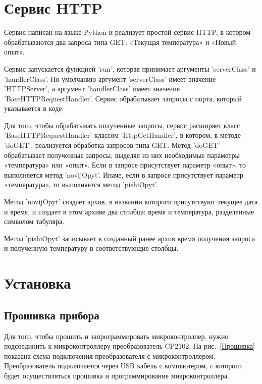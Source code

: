 \documentclass[12pt]{extarticle}
\begin{document}
\section{Сервис HTTP}\label{Сервис HTTP}

Сервис написан на языке Python и реализует простой сервис HTTP, в котором обрабатываются два запроса типа GET: «Текущая температура» и «Новый опыт».

Сервис запускается функцией 'run', которая принимает аргументы 'server\-Class' и 'handlerClass'. По умолчанию аргумент 'serverClass' имеет значение 'HTTPServer', а аргумент 'handlerClass' имеет значение 'Base\-HTTP\-Request\-Handler'. Сервис обрабатывает запросы с порта, который указывается в коде.

Для того, чтобы обрабатывать полученные запросы, сервис расширяет класс 'BaseHTTPRequestHandler' классом 'HttpGetHandler', в котором, в методе 'doGET', реализуется обработка запросов типа GET. Метод 'doGET' обрабатывает полученные запросы, выделяя из них необходимые параметры «температура» или «опыт». Если в запросе присутствует параметр «опыт», то выполняется метод 'novijOpyt'. Иначе, если в запросе присутствует параметр «температура», то выполняется метод 'pishiOpyt'.

Метод 'novijOpyt' создает архив, в названии которого присутствуют текущее дата и время, и создает в этом архиве два столбца: время и температура, разделенные символом табуляра. 

Метод 'pishiOpyt' записывает в созданный ранее архив время получения запроса и полученную температуру в соответствующие столбцы.

\section{Установка}\label{Установка}

\subsection{Прошивка прибора}\label{Прошивка прибора}

Для того, чтобы прошить и запрограммировать микроконтроллер, нужно подсоединить к микроконтроллеру преобразователь CP2102. На рис.~\ref{Прошивка} показана схема подключения преобразователя с микроконтроллером. Преобразователь подключается через USB кабель с компьютером, c которого будет осуществляться прошивка и программирование микроконтроллера.

\noindent%
\begin{minipage}{\linewidth}%
\vspace{0.5cm}
\centering
	
	\label{Прошивка}
	\vspace{4mm}
\end{minipage}
\end{document}
